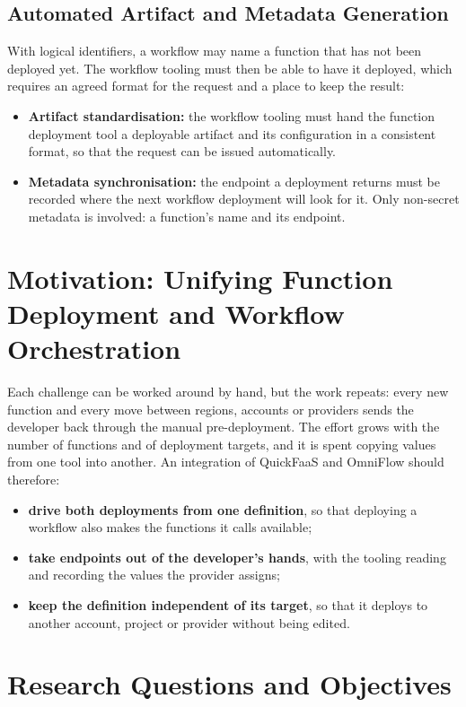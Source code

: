 \subsection{Automated Artifact and Metadata Generation}
With logical identifiers, a workflow may name a function that has not been deployed yet. The
workflow tooling must then be able to have it deployed, which requires an agreed format for the
request and a place to keep the result:
\begin{itemize}
	\item \textbf{Artifact standardisation:} the workflow tooling must hand the function deployment
	tool a deployable artifact and its configuration in a consistent format, so that the request can
	be issued automatically.
	\item \textbf{Metadata synchronisation:} the endpoint a deployment returns must be recorded where
	the next workflow deployment will look for it. Only non-secret metadata is involved: a
	function's name and its endpoint.
\end{itemize}

\section{Motivation: Unifying Function Deployment and Workflow Orchestration}
\label{sec:int_motivation}

Each challenge can be worked around by hand, but the work repeats: every new function and every
move between regions, accounts or providers sends the developer back through the manual
pre-deployment. The effort grows with the number of functions and of deployment targets, and it is
spent copying values from one tool into another. An integration of QuickFaaS and OmniFlow should
therefore:
\begin{itemize}
	\item \textbf{drive both deployments from one definition}, so that deploying a workflow also
	makes the functions it calls available;
	\item \textbf{take endpoints out of the developer's hands}, with the tooling reading and
	recording the values the provider assigns;
	\item \textbf{keep the definition independent of its target}, so that it deploys to another
	account, project or provider without being edited.
\end{itemize}

\section{Research Questions and Objectives}
\label{sec:int_objectives}

